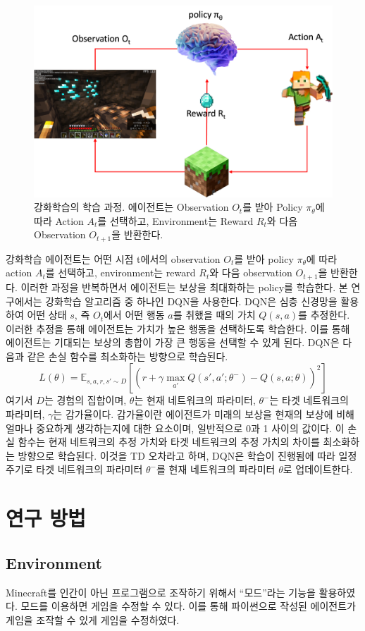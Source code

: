 \documentclass{tudelftposter}
\begin{document}
\begin{figure}
  \centering
  \includegraphics[width=.35\textwidth]{reinforcement.png}
  \caption{강화학습의 학습 과정. 에이전트는 Observation $O_t$를 받아 Policy $\pi_\theta$에 따라 Action $A_t$를 선택하고, Environment는 Reward $R_t$와 다음 Observation $O_{t+1}$을 반환한다.}
  \label{fig:reinforcement}
\end{figure}
강화학습 에이전트는 어떤 시점 t에서의 observation $O_t$를 받아 policy $\pi_\theta$에 따라 action $A_t$를 선택하고, environment는 reward $R_t$와 다음 observation $O_{t+1}$을 반환한다. 이러한 과정을 반복하면서 에이전트는 보상을 최대화하는 policy를 학습한다. 본 연구에서는 강화학습 알고리즘 중 하나인 DQN을 사용한다. DQN은 심층 신경망을 활용하여 어떤 상태 $s$, 즉 $O_t$에서 어떤 행동 $a$를 취했을 때의 가치 $Q(s,a)$를 추정한다. 이러한 추정을 통해 에이전트는 가치가 높은 행동을 선택하도록 학습한다. 이를 통해 에이전트는 기대되는 보상의 총합이 가장 큰 행동을 선택할 수 있게 된다. DQN은 다음과 같은 손실 함수를 최소화하는 방향으로 학습된다.
\begin{equation}
  L(\theta) = \mathbb{E}_{s,a,r,s' \sim D}[(r + \gamma \max_{a'}Q(s',a';\theta^-) - Q(s,a;\theta))^2]
\end{equation}
여기서 $D$는 경험의 집합이며, $\theta$는 현재 네트워크의 파라미터, $\theta^-$는 타겟 네트워크의 파라미터, $\gamma$는 감가율이다. 감가율이란 에이전트가 미래의 보상을 현재의 보상에 비해 얼마나 중요하게 생각하는지에 대한 요소이며, 일반적으로 0과 1 사이의 값이다. 이 손실 함수는 현재 네트워크의 추정 가치와 타겟 네트워크의 추정 가치의 차이를 최소화하는 방향으로 학습된다. 이것을 TD 오차라고 하며, DQN은 학습이 진행됨에 따라 일정 주기로 타겟 네트워크의 파라미터 $\theta^-$를 현재 네트워크의 파라미터 $\theta$로 업데이트한다.

\section{연구 방법}
\subsection{Environment}
Minecraft를 인간이 아닌 프로그램으로 조작하기 위해서 ``모드''라는 기능을 활용하였다. 모드를 이용하면 게임을 수정할 수 있다. 이를 통해 파이썬으로 작성된 에이전트가 게임을 조작할 수 있게 게임을 수정하였다.
\end{document}
